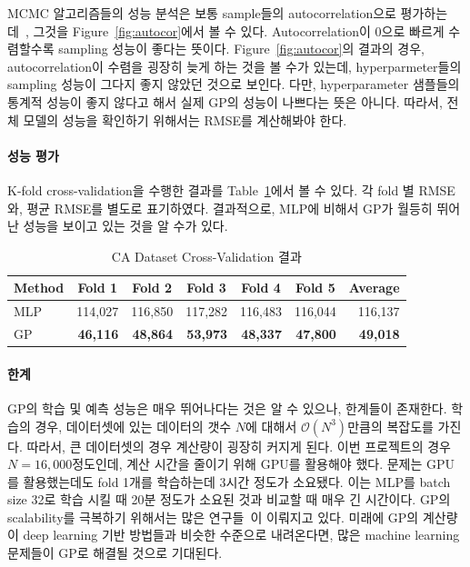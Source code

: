 \documentclass[ba, 11pt]{imsart}
\begin{document}
MCMC 알고리즘들의 성능 분석은 보통 sample들의 autocorrelation으로 평가하는데~\citep{geyer_practical_1992}, 그것을 Figure~\ref{fig:autocor}에서 볼 수 있다.
Autocorrelation이 0으로 빠르게 수렴할수록 sampling 성능이 좋다는 뜻이다.
Figure~\ref{fig:autocor}의 결과의 경우, autocorrelation이 수렴을 굉장히 늦게 하는 것을 볼 수가 있는데, hyperparmeter들의 sampling 성능이 그다지 좋지 않았던 것으로 보인다.
다만, hyperparameter 샘플들의 통계적 성능이 좋지 않다고 해서 실제 GP의 성능이 나쁘다는 뜻은 아니다.
따라서, 전체 모델의 성능을 확인하기 위해서는 RMSE를 계산해봐야 한다.

\paragraph{성능 평가}
K-fold cross-validation을 수행한 결과를 Table~\ref{table:cv}에서 볼 수 있다.
각 fold 별 RMSE와, 평균 RMSE를 별도로 표기하였다.
결과적으로, MLP에 비해서 GP가 월등히 뛰어난 성능을 보이고 있는 것을 알 수가 있다.

\begin{table}
  \centering
  \begin{threeparttable}
    \caption{CA Dataset Cross-Validation 결과}\label{table:cv}
    \begin{tabular}{l|rrrrr|r} \toprule
      \multicolumn{1}{c}{\textbf{Method}}
      & \multicolumn{1}{c}{\textbf{Fold 1}}
      & \multicolumn{1}{c}{\textbf{Fold 2}}
      & \multicolumn{1}{c}{\textbf{Fold 3}}
      & \multicolumn{1}{c}{\textbf{Fold 4}}
      & \multicolumn{1}{c}{\textbf{Fold 5}}
      & \multicolumn{1}{c}{\textbf{Average}}
      \\ \midrule
      MLP & 114,027 & 116,850 & 117,282 & 116,483 & 116,044 & 116,137 \\
      GP  & \textbf{46,116}	& \textbf{48,864}  & \textbf{53,973} &  \textbf{48,337}  & \textbf{47,800}  & \textbf{49,018}
      \\ \bottomrule
    \end{tabular}
  \end{threeparttable}
\end{table}

\paragraph{한계}
GP의 학습 및 예측 성능은 매우 뛰어나다는 것은 알 수 있으나, 한계들이 존재한다.
학습의 경우, 데이터셋에 있는 데이터의 갯수 \(N\)에 대해서 \(\mathcal{O}(N^3)\)만큼의 복잡도를 가진다.
따라서, 큰 데이터셋의 경우 계산량이 굉장히 커지게 된다.
이번 프로젝트의 경우 \(N = 16,000\)정도인데, 계산 시간을 줄이기 위해 GPU를 활용해야 했다.
문제는 GPU를 활용했는데도 fold 1개를 학습하는데 3시간 정도가 소요됐다.
이는 MLP를 batch size 32로 학습 시킬 때 20분 정도가 소요된 것과 비교할 때 매우 긴 시간이다.
GP의 scalability를 극복하기 위해서는 많은 연구들~\citep{hensman_mcmc_2015, yu_stochastic_2017, wang_exact_2019}이 이뤄지고 있다.
미래에 GP의 계산량이 deep learning 기반 방법들과 비슷한 수준으로 내려온다면, 많은 machine learning 문제들이 GP로 해결될 것으로 기대된다.



\end{document}
